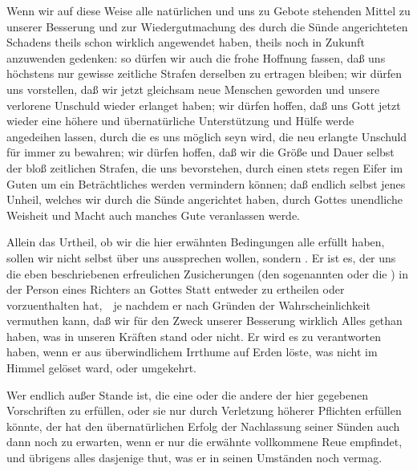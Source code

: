 \begin{aufza}
\item Wenn wir auf diese Weise alle natürlichen und uns zu Gebote stehenden Mittel zu unserer Besserung und zur Wiedergutmachung des durch die Sünde angerichteten Schadens theils schon wirklich angewendet haben, theils noch in Zukunft anzuwenden gedenken: so dürfen wir auch die frohe Hoffnung fassen,  daß uns höchstens nur gewisse zeitliche Strafen derselben zu ertragen bleiben; wir dürfen uns vorstellen, daß wir jetzt gleichsam neue Menschen geworden und unsere verlorene Unschuld wieder erlanget haben; wir dürfen hoffen, daß uns Gott jetzt wieder eine höhere und übernatürliche Unterstützung und Hülfe werde angedeihen lassen, durch die es uns möglich seyn wird, die neu erlangte Unschuld für immer zu bewahren; wir dürfen hoffen, daß wir die Größe und Dauer selbst der bloß zeitlichen Strafen, die uns bevorstehen, durch einen stets regen Eifer im Guten um ein Beträchtliches werden vermindern können; daß endlich selbst jenes Unheil, welches wir durch die Sünde angerichtet haben, durch Gottes unendliche Weisheit und Macht auch manches Gute veranlassen werde.
\item Allein das Urtheil, ob wir die hier erwähnten Bedingungen alle erfüllt haben, sollen wir nicht selbst über uns aussprechen wollen, sondern . Er ist es, der uns die eben beschriebenen erfreulichen Zusicherungen (den sogenannten  oder die ) in der Person eines Richters an Gottes Statt entweder zu ertheilen oder vorzuenthalten hat,~\ je nachdem er nach Gründen der Wahrscheinlichkeit vermuthen kann, daß wir für den Zweck unserer Besserung wirklich Alles gethan haben, was in unseren Kräften stand oder nicht. Er wird es zu verantworten haben, wenn er aus überwindlichem Irrthume auf Erden löste, was nicht im Himmel gelöset ward, oder umgekehrt.
\item Wer endlich außer Stande ist, die eine oder die andere der hier gegebenen Vorschriften zu erfüllen, oder sie nur durch Verletzung höherer Pflichten erfüllen könnte, der hat den übernatürlichen Erfolg der Nachlassung seiner Sünden auch dann noch zu erwarten, wenn er nur die erwähnte vollkommene Reue empfindet, und übrigens alles dasjenige thut, was er in seinen Umständen noch vermag.
\end{aufza}

